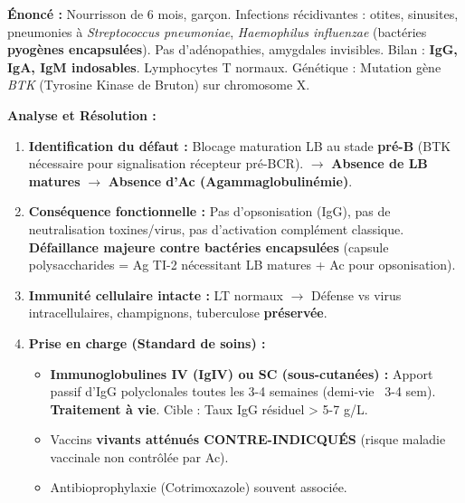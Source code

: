 \documentclass[11pt]{article}
\begin{document}
\begin{exoresolu}
\textbf{Énoncé :} Nourrisson de 6 mois, garçon. Infections récidivantes : otites, sinusites, pneumonies à \textit{Streptococcus pneumoniae}, \textit{Haemophilus influenzae} (bactéries \textbf{pyogènes encapsulées}). Pas d'adénopathies, amygdales invisibles. Bilan : \textbf{IgG, IgA, IgM indosables}. Lymphocytes T normaux. Génétique : Mutation gène \textit{BTK} (Tyrosine Kinase de Bruton) sur chromosome X.

\textbf{Analyse et Résolution :}
\begin{enumerate}
    \item \textbf{Identification du défaut :} Blocage maturation LB au stade \textbf{pré-B} (BTK nécessaire pour signalisation récepteur pré-BCR). $\rightarrow$ \textbf{Absence de LB matures} $\rightarrow$ \textbf{Absence d'Ac (Agammaglobulinémie)}.
    \item \textbf{Conséquence fonctionnelle :} Pas d'opsonisation (IgG), pas de neutralisation toxines/virus, pas d'activation complément classique. \textbf{Défaillance majeure contre bactéries encapsulées} (capsule polysaccharides = Ag TI-2 nécessitant LB matures + Ac pour opsonisation).
    \item \textbf{Immunité cellulaire intacte :} LT normaux $\rightarrow$ Défense vs virus intracellulaires, champignons, tuberculose \textbf{préservée}.
    \item \textbf{Prise en charge (Standard de soins) :}
        \begin{itemize}
            \item \textbf{Immunoglobulines IV (IgIV) ou SC (sous-cutanées) :} Apport passif d'IgG polyclonales toutes les 3-4 semaines (demi-vie ~3-4 sem). \textbf{Traitement à vie}. Cible : Taux IgG résiduel > 5-7 g/L.
            \item Vaccins \textbf{vivants atténués CONTRE-INDICQUÉS} (risque maladie vaccinale non contrôlée par Ac).
            \item Antibioprophylaxie (Cotrimoxazole) souvent associée.
        \end{itemize}
\end{enumerate}
\end{exoresolu}
\end{document}
